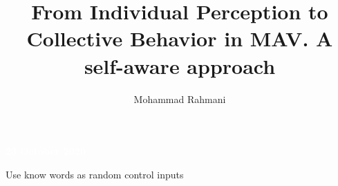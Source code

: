 \documentclass[unknownkeysallowed]{beamer}
\title{From Individual Perception to Collective Behavior in MAV. A self-aware approach}
\author{Mohammad Rahmani}
\institute{Pervasive Computing Group}
\begin{document}
	\begin{frame}
		\date{}
		\maketitle
		\textcolor{white}{\textbf{23 October 2020}}
	\end{frame}
	
	
	\begin{frame}{Use know words as random control inputs}
		
	\end{frame}
\end{document}
